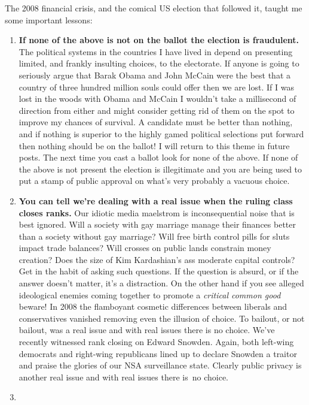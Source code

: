 The 2008 financial crisis, and the comical US election that followed it,
taught me some important lessons:

\begin{enumerate}
\item
  \textbf{If none of the above is not on the ballot the election
  is fraudulent.} The political systems in the countries I have
  lived in depend on presenting limited, and frankly insulting choices,
  to the electorate. If anyone is going to seriously argue that Barak
  Obama and John McCain were the best that a country of three hundred
  million souls could offer then we are lost. If I was lost in the woods
  with Obama and McCain I wouldn't take a millisecond of direction from
  either and might consider getting rid of them on the spot to improve
  my chances of survival. A candidate must be better than nothing, and
  if nothing is superior to the highly gamed political selections put
  forward then nothing should be on the ballot! I will return to this
  theme in future posts. The next time you cast a ballot look for none
  of the above. If none of the above is not present the election is
  illegitimate and you are being used to put a stamp of public approval
  on what's very probably a vacuous choice.
\item
  \textbf{You can tell we're dealing with a real issue when the
  ruling class closes ranks.} Our idiotic media maelstrom is
  inconsequential noise that is best ignored. Will a society with gay
  marriage manage their finances better than a society without gay
  marriage? Will free birth control pills for sluts impact trade
  balances? Will crosses on public lands constrain money creation? Does
  the size of Kim Kardashian's ass moderate capital controls? Get in
  the habit of asking such questions. If the question is absurd, or if
  the answer doesn't matter, it's a distraction. On the other hand if
  you see alleged ideological enemies coming together to promote a
  \emph{critical common good} beware! In 2008 the flamboyant cosmetic
  differences between liberals and conservatives vanished removing even
  the illusion of choice. To bailout, or not bailout, was a real issue
  and with real issues there is no choice. We've recently witnessed rank
  closing on Edward Snowden. Again, both left-wing democrats and
  right-wing republicans lined up to declare Snowden a traitor and
  praise the glories of our NSA surveillance state. Clearly public
  privacy is another real issue and with real issues there is~no choice.
\item

\end{enumerate}
